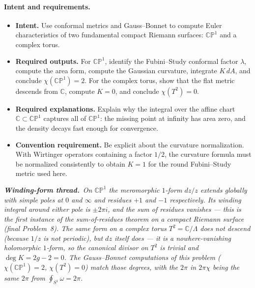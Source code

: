 \documentclass[11pt]{article}
\newcommand{\windingnote}[1]{%
\par\smallskip
\noindent\begin{minipage}{\linewidth}%
\color{windingblue}\small%
\textbf{\textit{Winding-form thread.}}\ \textit{#1}%
\end{minipage}\par\smallskip%
}
\newenvironment{intentrequirements}{%
\paragraph{Intent and requirements.}
\begin{itemize}[leftmargin=*, itemsep=0.25em]
}{%
\end{itemize}
}
\newcommand{\C}{\mathbb{C}}
\newcommand{\CP}{\mathbb{CP}}
\begin{document}
\begin{intentrequirements}
\item \textbf{Intent.} Use conformal metrics and Gauss--Bonnet to compute Euler characteristics of two fundamental compact Riemann surfaces: $\CP^1$ and a complex torus.
\item \textbf{Required outputs.} For $\CP^1$, identify the Fubini--Study conformal factor $\lambda$, compute the area form, compute the Gaussian curvature, integrate $K\,dA$, and conclude $\chi(\CP^1)=2$. For the complex torus, show that the flat metric descends from $\C$, compute $K=0$, and conclude $\chi(T^2)=0$.
\item \textbf{Required explanations.} Explain why the integral over the affine chart $\C\subset\CP^1$ captures all of $\CP^1$: the missing point at infinity has area zero, and the density decays fast enough for convergence.
\item \textbf{Convention requirement.} Be explicit about the curvature normalization. With Wirtinger operators containing a factor $1/2$, the curvature formula must be normalized consistently to obtain $K=1$ for the round Fubini--Study metric used here.
\end{intentrequirements}

\windingnote{On $\CP^1$ the meromorphic $1$-form $dz/z$ extends globally with simple poles at $0$ and $\infty$ and residues $+1$ and $-1$ respectively. Its winding integral around either pole is $\pm 2\pi i$, and the sum of residues vanishes --- this is the first instance of the sum-of-residues theorem on a compact Riemann surface (final Problem~8). The same form on a complex torus $T^2=\C/\Lambda$ \emph{does not descend} (because $1/z$ is not periodic), but $dz$ itself does --- it is a nowhere-vanishing holomorphic $1$-form, so the canonical divisor on $T^2$ is trivial and $\deg K=2g-2=0$. The Gauss--Bonnet computations of this problem ($\chi(\CP^1)=2$, $\chi(T^2)=0$) match those degrees, with the $2\pi$ in $2\pi\chi$ being the same $2\pi$ from $\oint_{S^1}\omega=2\pi$.}
\end{document}
